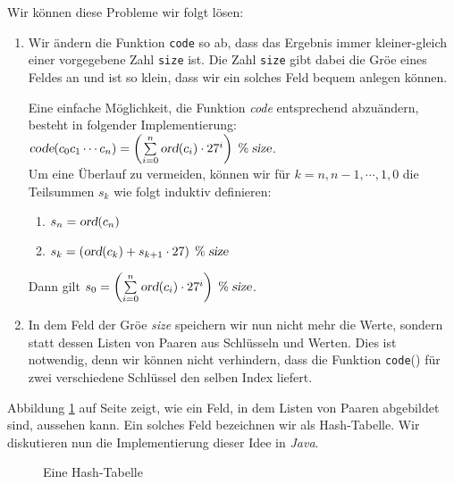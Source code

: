 Wir k\"onnen diese Probleme wir folgt l\"osen:
\begin{enumerate}
\item Wir \"andern die Funktion \texttt{code} so ab, dass das Ergebnis
      immer kleiner-gleich einer vorgegebene Zahl \texttt{size} ist.  Die Zahl
      \texttt{size} gibt dabei die Gr\"o\3e eines Feldes an und ist so klein,
      dass wir ein solches Feld bequem anlegen k\"onnen.

      Eine einfache M\"oglichkeit, die Funktion \textsl{code} entsprechend abzu\"andern,
      besteht in folgender Implementierung: \\[0.2cm]
      \hspace*{1.3cm} 
      $\textsl{code}(c_0c_1\cdots c_n) = \left(\sum\limits_{i=0}^n \textsl{ord}(c_i) \cdot 27^i\right) \;\%\; \textsl{size}$.
      \\[0.2cm]
      Um eine Überlauf zu vermeiden, k\"onnen wir f\"ur $k=n,n-1,\cdots,1,0$ die Teilsummen $s_k$
      wie folgt induktiv definieren:
      \begin{enumerate}
      \item $s_n = \textsl{ord}(c_n)$
      \item $s_{k} = \left(\textsl{ord}(c_{k}) + s_{k+1} \cdot 27 \right) \;\%\; \textsl{size}$
      \end{enumerate}
      Dann gilt
      \hspace*{1.3cm} 
      $s_0 = \left(\sum\limits_{i=0}^n \textsl{ord}(c_i) \cdot 27^i\right) \;\%\; \textsl{size}$.
      
\item In dem Feld der Gr\"o\3e \textsl{size} speichern wir nun nicht mehr die Werte, sondern statt dessen
      Listen von Paaren aus Schl\"usseln und Werten.  Dies ist notwendig, denn wir k\"onnen
      nicht verhindern, dass die Funktion \texttt{code}() f\"ur zwei verschiedene
      Schl\"ussel den selben Index liefert.
\end{enumerate}
Abbildung \ref{fig:hash-example} auf Seite \pageref{fig:hash-example} zeigt, wie ein Feld,
in dem Listen von Paaren abgebildet sind, aussehen kann.  Ein solches Feld bezeichnen wir
als Hash-Tabelle.  Wir diskutieren nun die Implementierung dieser Idee in \textsl{Java}.


\begin{figure}[!ht]
  \centering
  \caption{Eine Hash-Tabelle}
  \label{fig:hash-example}
\end{figure}


